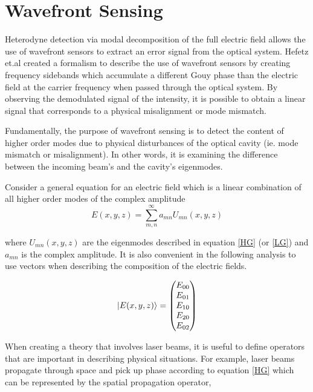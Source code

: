 		
		\section{Wavefront Sensing}\label{WFS}
		Heterodyne detection via modal decomposition of the full electric field allows the use of wavefront sensors to extract an error signal from the optical system.  Hefetz et.al \cite{HefetzWFS} created a formalism to describe the use of wavefront sensors by creating frequency sidebands which accumulate a different Gouy phase than the electric field at the carrier frequency when passed through the optical system.  By observing the demodulated signal of the intensity, it is possible to obtain a linear signal that corresponds to a physical misalignment or mode mismatch.
		
		Fundamentally, the purpose of wavefront sensing is to detect the content of higher order modes due to physical disturbances of the optical cavity (ie. mode mismatch or misalignment).  In other words, it is examining the difference between the incoming beam's and the cavity's eigenmodes.
		
		Consider a general equation for an electric field which is a linear combination of all higher order modes of the complex amplitude
		\begin{equation}
		E(x,y,z) = \sum\limits_{m,n}^{\infty} a_{mn} U_{mn}(x,y,z)
		\end{equation}
		
		where $ U_{mn}(x,y,z)$ are the eigenmodes described in equation \ref{HG} (or \ref{LG}) and $a_{mn}$ is the complex amplitude.  It is also convenient in the following analysis to use vectors when describing the composition of the electric fields.
		
		\begin{equation}\label{EVector}
		\ket{E(x,y,z)} = \begin{pmatrix} E_{00} 
		\\ E_{01}
		\\E_{10}
		\\E_{20}
		\\E_{02}
		\end{pmatrix}
		\end{equation}

		When creating a theory that involves laser beams, it is useful to define operators that are important in describing physical situations.  For example, laser beams propagate through space and pick up phase according to equation \ref{HG} which can be represented by the spatial propagation operator,
		

